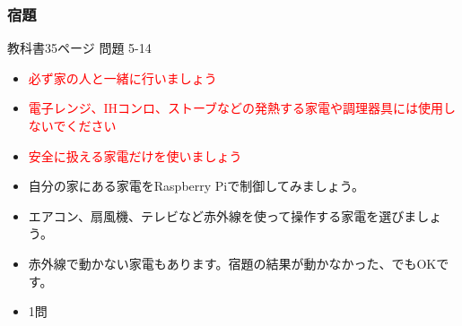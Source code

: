 \documentclass[slide05.tex]{subfiles}
\begin{document}
\begin{frame}
    \frametitle{宿題}
    教科書35ページ 問題 5-14
    \begin{itemize}
        \item \textcolor{red}{必ず家の人と一緒に行いましょう}
        \item \textcolor{red}{電子レンジ、IHコンロ、ストーブなどの発熱する家電や調理器具には使用しないでください}
        \item \textcolor{red}{安全に扱える家電だけを使いましょう}
        \item 自分の家にある家電をRaspberry Piで制御してみましょう。
        \item エアコン、扇風機、テレビなど赤外線を使って操作する家電を選びましょう。
        \item 赤外線で動かない家電もあります。宿題の結果が動かなかった、でもOKです。
        \item 1問
    \end{itemize}
\end{frame}
\end{document}
